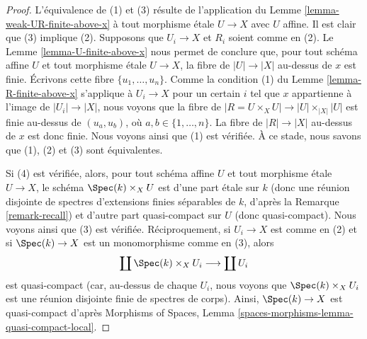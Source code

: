 \begin{proof}
L'équivalence de (1) et (3) résulte de l'application du
Lemme \ref{lemma-weak-UR-finite-above-x}
à tout morphisme étale $U \to X$ avec $U$ affine.
Il est clair que (3) implique (2).
Supposons que $U_i \to X$ et $R_i$ soient comme en (2). Le
Lemme \ref{lemma-U-finite-above-x}
nous permet de conclure que, pour tout schéma affine $U$ et tout morphisme
étale $U \to X$, la fibre de $|U| \to |X|$ au-dessus de $x$ est finie.
Écrivons cette fibre $\{u_1, \ldots, u_n\}$. Comme la condition (1) du
Lemme \ref{lemma-R-finite-above-x}
s'applique à $U_i \to X$ pour un certain $i$ tel que $x$ appartienne à
l'image de $|U_i| \to |X|$, nous voyons que la fibre de
$|R = U \times_X U| \to |U| \times_{|X|} |U|$
est finie au-dessus de $(u_a, u_b)$, où $a, b \in \{1, \ldots, n\}$.
La fibre de $|R| \to |X|$ au-dessus de $x$ est donc finie.
Nous voyons ainsi que (1) est vérifiée. À ce stade, nous savons que
(1), (2) et (3) sont équivalentes.

\medskip\noindent
Si (4) est vérifiée, alors, pour tout schéma affine $U$ et tout morphisme
étale $U \to X$, le schéma $\Spec(k) \times_X U$ est d'une part
étale sur $k$ (donc une réunion disjointe de spectres d'extensions finies
séparables de $k$, d'après la
Remarque \ref{remark-recall})
et d'autre part quasi-compact sur $U$ (donc quasi-compact).
Nous voyons ainsi que (3) est vérifiée.
Réciproquement, si $U_i \to X$ est comme en (2) et si $\Spec(k) \to X$
est un monomorphisme comme en (3), alors
$$
\coprod \Spec(k) \times_X U_i
\longrightarrow
\coprod U_i
$$
est quasi-compact (car, au-dessus de chaque $U_i$, nous voyons que
$\Spec(k) \times_X U_i$ est une réunion disjointe finie de spectres de corps).
Ainsi, $\Spec(k) \to X$ est quasi-compact d'après
Morphisms of Spaces, Lemma \ref{spaces-morphisms-lemma-quasi-compact-local}.


\end{proof}
